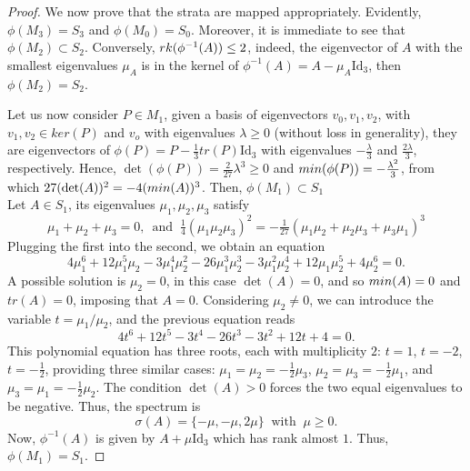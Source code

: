 \documentclass[10pt,a4paper]{amsart}
\begin{document}
\begin{proof}
    \medskip

    We now prove that the strata are mapped appropriately. Evidently, $\phi(M_3)=S_3$ and $\phi(M_0)=S_0$. Moreover, it is immediate to see that $\phi(M_2)\subset S_2$. Conversely, ${\rm rk}(\phi^{-1}(A))\leq 2$, indeed, the eigenvector of $A$ with the smallest eigenvalues $\mu_A$ is in the kernel of $\phi^{-1}(A)=A-\mu_A\mathrm{Id}_3$, then $\phi(M_2)= S_2$.
    
    Let us now consider $P\in M_1$, given a basis of eigenvectors $v_0,v_1,v_2$, with $v_1,v_2\in{ ker}(P)$ and $v_o$ with eigenvalues $\lambda\geq 0$ (without loss in generality), they are eigenvectors of $\phi(P)=P-\frac{1}{3}tr(P)\mathrm{Id}_3$ with eigenvalues $-\frac{\lambda}{3}$ and $\frac{2\lambda}{3}$, respectively. Hence, $\det(\phi(P))=\frac{2}{27}\lambda^3\geq 0$ and ${\rm min}(\phi(P))=-\frac{\lambda^2}{3}$, from which $27(\det(A))^2=-4({\rm min}(A))^3$. Then, $\phi(M_1)\subset S_1$\\
    Let $A\in S_1$, its eigenvalues $\mu_1,\mu_2,\mu_3$ satisfy
    \begin{equation*}
        \mu_1+\mu_2+\mu_3=0,\,\text{ and }\ \tfrac{1}{4}(\mu_1\mu_2\mu_3)^2=-\tfrac{1}{27}(\mu_1\mu_2+\mu_2\mu_3+\mu_3\mu_1)^3
    \end{equation*}
    Plugging the first into the second, we obtain an equation
    \[4\mu_1^6+12\mu_1^5\mu_2-3\mu_1^4\mu_2^2-26\mu_1^3\mu_2^3-3\mu_1^2\mu_2^4+12\mu_1\mu_2^5+4\mu_2^6=0.\]
    A possible solution is $\mu_2=0$, in this case $\det(A)=0$, and so ${\rm min}(A)=0$ and $tr(A)=0$, imposing that $A=0$. Considering $\mu_2\neq 0$, we can introduce the variable $t=\mu_1/\mu_2$, and the previous equation reads
    \[4t^6+12t^5-3t^4-26t^3-3t^2+12t+4=0.\]
    This polynomial equation has three roots, each with multiplicity $2$: $t=1$, $t=-2$, $t=-\frac{1}{2}$, providing three similar cases: $\mu_1=\mu_2=-\frac{1}{2}\mu_3$, $\mu_2=\mu_3=-\frac{1}{2}\mu_1$, and $\mu_3=\mu_1=-\frac{1}{2}\mu_2$. The condition $\det(A)>0$ forces the two equal eigenvalues to be negative. Thus, the spectrum is 
    \[\sigma(A)=\{-\mu,-\mu,2\mu\}\ \text{ with }\ \mu\geq 0.\]
    Now, $\phi^{-1}(A)$ is given by $A+\mu\mathrm{Id}_3$ which has rank almost $1$. Thus, $\phi(M_1)=S_1$.
\end{proof}
\end{document}
